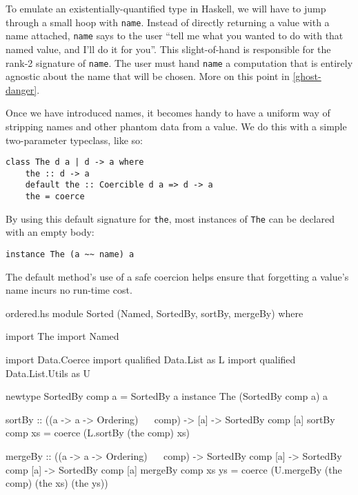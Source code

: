 \documentclass[format=sigplan, review=false, screen=true, 10pt]{acmart}
\begin{document}
To emulate an existentially-quantified type in Haskell, we will have to jump through
a small hoop with \texttt{name}. Instead of directly returning a value with a name attached,
\texttt{name} says to the user ``tell me what you wanted to do with that named value,
and I'll do it for you''. This slight-of-hand is responsible for the rank-2
signature of \texttt{name}. The user must hand \texttt{name} a computation that is
entirely agnostic about the name that will be chosen. More on this point in \cref{ghost-danger}.

Once we have introduced names, it becomes handy to have a uniform way of stripping names
and other phantom data from a value. We do this with a simple two-parameter typeclass,
like so:
\begin{verbatim}
class The d a | d -> a where
    the :: d -> a
    default the :: Coercible d a => d -> a
    the = coerce
\end{verbatim}
By using this default signature for \texttt{the}, most instances of \texttt{The}
can be declared with an empty body:
\begin{verbatim}
instance The (a ~~ name) a
\end{verbatim}
The default method's use of a safe coercion helps ensure that forgetting a value's name 
incurs no run-time cost.

\begin{filecontents*}{ordered.hs}
module Sorted (Named, SortedBy, sortBy, mergeBy) where   

import The
import Named

import           Data.Coerce
import qualified Data.List       as L
import qualified Data.List.Utils as U

newtype SortedBy comp a = SortedBy a
instance The (SortedBy comp a) a
  
sortBy :: ((a -> a -> Ordering) ~~ comp)
       -> [a]
       -> SortedBy comp [a]
sortBy comp xs = coerce (L.sortBy (the comp) xs)

mergeBy :: ((a -> a -> Ordering) ~~ comp)
        -> SortedBy comp [a]
        -> SortedBy comp [a]
        -> SortedBy comp [a]
mergeBy comp xs ys =
  coerce (U.mergeBy (the comp) (the xs) (the ys))        
\end{filecontents*}

\end{document}
